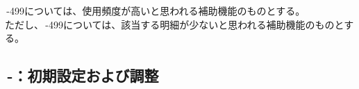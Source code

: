 \clearpage
\,-\ttNum499については、使用頻度が高いと思われる補助機能のものとする。\\
ただし、\,-\ttNum499については、該当する明細が少ないと思われる補助機能のものとする。


\subsection{\,-：初期設定および調整}

